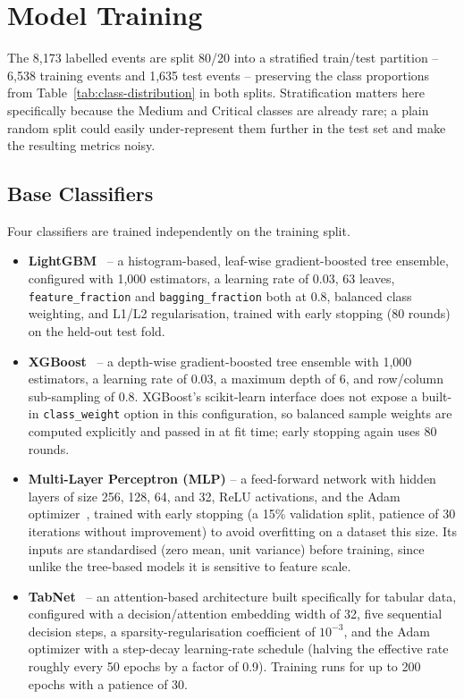 \section{Model Training}
\label{sec:base-classifiers}

The 8{,}173 labelled events are split 80/20 into a stratified train/test partition -- 6{,}538 training events and 1{,}635 test events -- preserving the class proportions from Table~\ref{tab:class-distribution} in both splits. Stratification matters here specifically because the Medium and Critical classes are already rare; a plain random split could easily under-represent them further in the test set and make the resulting metrics noisy.

\subsection{Base Classifiers}

Four classifiers are trained independently on the training split.

\begin{itemize}
\item \textbf{LightGBM}~\cite{ke2017lightgbm} -- a histogram-based, leaf-wise gradient-boosted tree ensemble, configured with 1{,}000 estimators, a learning rate of 0.03, 63 leaves, \texttt{feature\_fraction} and \texttt{bagging\_fraction} both at 0.8, balanced class weighting, and L1/L2 regularisation, trained with early stopping (80 rounds) on the held-out test fold.
\item \textbf{XGBoost}~\cite{chen2016xgboost} -- a depth-wise gradient-boosted tree ensemble with 1{,}000 estimators, a learning rate of 0.03, a maximum depth of 6, and row/column sub-sampling of 0.8. XGBoost's scikit-learn interface does not expose a built-in \texttt{class\_weight} option in this configuration, so balanced sample weights are computed explicitly and passed in at fit time; early stopping again uses 80 rounds.
\item \textbf{Multi-Layer Perceptron (MLP)} -- a feed-forward network with hidden layers of size 256, 128, 64, and 32, ReLU activations, and the Adam optimizer~\cite{kingma2015adam}, trained with early stopping (a 15\% validation split, patience of 30 iterations without improvement) to avoid overfitting on a dataset this size. Its inputs are standardised (zero mean, unit variance) before training, since unlike the tree-based models it is sensitive to feature scale.
\item \textbf{TabNet}~\cite{arik2021tabnet} -- an attention-based architecture built specifically for tabular data, configured with a decision/attention embedding width of 32, five sequential decision steps, a sparsity-regularisation coefficient of $10^{-3}$, and the Adam optimizer with a step-decay learning-rate schedule (halving the effective rate roughly every 50 epochs by a factor of 0.9). Training runs for up to 200 epochs with a patience of 30.
\end{itemize}


